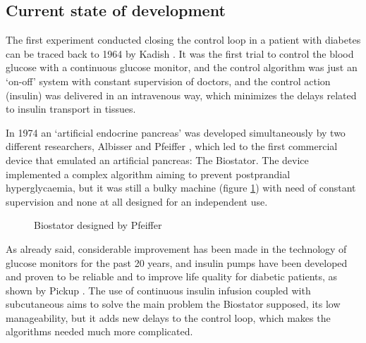 
\subsection{Current state of development}
\label{sec:Currentstateofdevelopment}

The first experiment conducted closing the control loop in a patient with diabetes can be traced back to 1964 by Kadish \cite{kadish1963automation}. It was the first trial to control the blood glucose with a continuous glucose monitor, and the control algorithm was just an `on-off' system with constant supervision of doctors, and the control action (insulin) was delivered in an intravenous way, which minimizes the delays related to insulin transport in tissues. 

In 1974 an `artificial endocrine pancreas' was developed simultaneously by two different researchers, Albisser \cite{albisser1974artificial} and Pfeiffer \cite{pfeiffer1974artificial}, which led to the first commercial device that emulated an artificial pancreas: The Biostator. The device implemented a complex algorithm aiming to prevent postprandial hyperglycaemia, but it was still a bulky machine (figure \ref{fig:biostator}) with need of constant supervision and none at all designed for an independent use.

\begin{figure}[hbtp]
\centering
{}\caption{Biostator designed by Pfeiffer \cite{pfeiffer1974artificial}}
\label{fig:biostator}
\end{figure}

As already said, considerable improvement has been made in the technology of glucose monitors for the past 20 years, and insulin pumps have been developed and proven to be reliable and to improve life quality for diabetic patients, as shown by Pickup \cite{pickup2002continuous}. The use of continuous insulin infusion coupled with subcutaneous aims to solve the main problem the Biostator supposed, its low manageability, but it adds new delays to the control loop, which makes the algorithms needed much more complicated.

